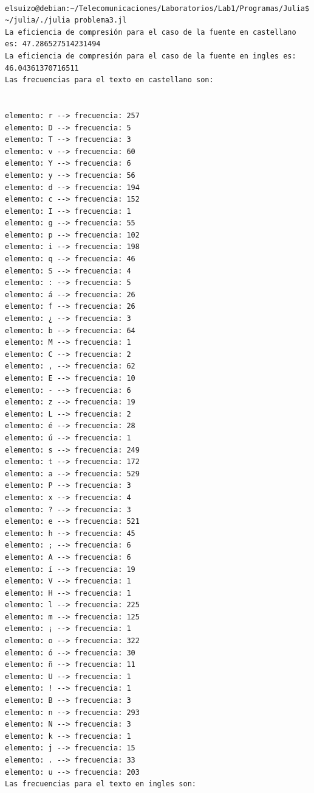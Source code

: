 \documentclass[10pt]{article}
\begin{document}
\begin{verbatim}

elsuizo@debian:~/Telecomunicaciones/Laboratorios/Lab1/Programas/Julia$ ~/julia/./julia problema3.jl 
La eficiencia de compresión para el caso de la fuente en castellano es: 47.286527514231494
La eficiencia de compresión para el caso de la fuente en ingles es: 46.04361370716511
Las frecuencias para el texto en castellano son:


elemento: r --> frecuencia: 257
elemento: D --> frecuencia: 5
elemento: T --> frecuencia: 3
elemento: v --> frecuencia: 60
elemento: Y --> frecuencia: 6
elemento: y --> frecuencia: 56
elemento: d --> frecuencia: 194
elemento: c --> frecuencia: 152
elemento: I --> frecuencia: 1
elemento: g --> frecuencia: 55
elemento: p --> frecuencia: 102
elemento: i --> frecuencia: 198
elemento: q --> frecuencia: 46
elemento: S --> frecuencia: 4
elemento: : --> frecuencia: 5
elemento: á --> frecuencia: 26
elemento: f --> frecuencia: 26
elemento: ¿ --> frecuencia: 3
elemento: b --> frecuencia: 64
elemento: M --> frecuencia: 1
elemento: C --> frecuencia: 2
elemento: , --> frecuencia: 62
elemento: E --> frecuencia: 10
elemento: - --> frecuencia: 6
elemento: z --> frecuencia: 19
elemento: L --> frecuencia: 2
elemento: é --> frecuencia: 28
elemento: ú --> frecuencia: 1
elemento: s --> frecuencia: 249
elemento: t --> frecuencia: 172
elemento: a --> frecuencia: 529
elemento: P --> frecuencia: 3
elemento: x --> frecuencia: 4
elemento: ? --> frecuencia: 3
elemento: e --> frecuencia: 521
elemento: h --> frecuencia: 45
elemento: ; --> frecuencia: 6
elemento: A --> frecuencia: 6
elemento: í --> frecuencia: 19
elemento: V --> frecuencia: 1
elemento: H --> frecuencia: 1
elemento: l --> frecuencia: 225
elemento: m --> frecuencia: 125
elemento: ¡ --> frecuencia: 1
elemento: o --> frecuencia: 322
elemento: ó --> frecuencia: 30
elemento: ñ --> frecuencia: 11
elemento: U --> frecuencia: 1
elemento: ! --> frecuencia: 1
elemento: B --> frecuencia: 3
elemento: n --> frecuencia: 293
elemento: N --> frecuencia: 3
elemento: k --> frecuencia: 1
elemento: j --> frecuencia: 15
elemento: . --> frecuencia: 33
elemento: u --> frecuencia: 203
Las frecuencias para el texto en ingles son:



\end{verbatim}
\end{document}
